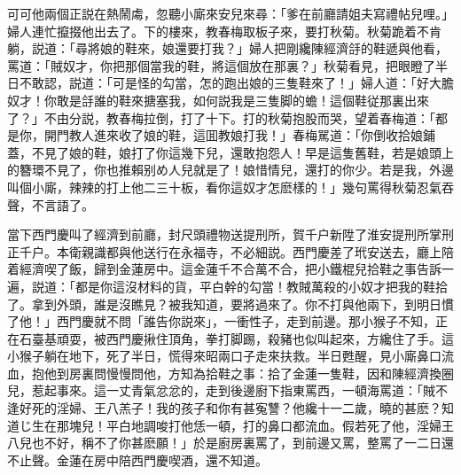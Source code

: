 可可他兩個正説在熱鬧䖏，忽聽小廝來安兒來尋：「爹在前廳請姐夫寫禮帖兒哩。」婦人連忙攛掇他出去了。下的樓來，教春梅取板子來，要打秋菊。秋菊跪着不肯躺，説道：「尋將娘的鞋來，娘還要打我？」婦人把剛纔陳經濟㧱的鞋遞與他看，罵道：「賊奴才，你把那個當我的鞋，將這個放在那裏？」秋菊看見，把眼瞪了半日不敢認，説道：「可是怪的勾當，怎的跑出娘的三隻鞋來了！」婦人道：「好大膽奴才！你敢是㧱誰的鞋來搪塞我，如何説我是三隻脚的蟾！這個鞋従那裏出來了？」不由分説，教春梅拉倒，打了十下。打的秋菊抱股而哭，望着春梅道：「都是你，開門教人進來收了娘的鞋，這囬教娘打我！」春梅駡道：「你倒收拾娘鋪蓋，不見了娘的鞋，娘打了你這幾下兒，還敢抱怨人！早是這隻舊鞋，若是娘頭上的簪環不見了，你也推賴别め人兒就是了！娘惜情兒，還打的你少。若是我，外邊叫個小廝，辣辣的打上他二三十板，看你這奴才怎麽樣的！」幾句罵得秋菊忍氣吞聲，不言語了。

當下西門慶叫了經濟到前廳，封尺頭禮物送提刑所，賀千户新陞了淮安提刑所掌刑正千户。本衛親識都與他送行在永福寺，不必細説。西門慶差了玳安送去，廳上陪着經濟喫了飯，歸到金蓮房中。這金蓮千不合萬不合，把小鐵棍兒拾鞋之事告訴一遍，説道：「都是你這沒材料的貨，平白幹的勾當！教賊萬殺的小奴才把我的鞋拾了。拿到外頭，誰是沒瞧見？被我知道，要將過來了。你不打與他兩下，到明日慣了他！」西門慶就不問「誰告你説來」，一衝性子，走到前邊。那小猴子不知，正在石臺基頑耍，被西門慶揪住頂角，拳打脚踢，殺豬也似叫起來，方纔住了手。這小猴子躺在地下，死了半日，慌得來昭兩口子走來扶救。半日甦醒，見小廝鼻口流血，抱他到房裏問慢慢問他，方知為拾鞋之事：拾了金蓮一隻鞋，因和陳經濟換圈兒，惹起事來。這一丈青氣忿忿的，走到後邊廚下指東罵西，一頓海罵道：「賊不逢好死的淫婦、王八羔子！我的孩子和你有甚寃讐？他纔十一二歲，曉的甚麽？知道じ生在那塊兒！平白地調唆打他恁一頓，打的鼻口都流血。假若死了他，淫婦王八兒也不好，稱不了你甚麽願！」於是廚房裏罵了，到前邊又罵，整罵了一二日還不止聲。金蓮在房中陪西門慶喫酒，還不知道。

